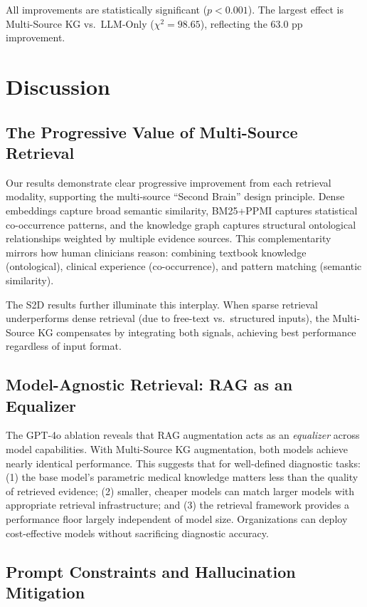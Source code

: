 \documentclass[preprint,12pt]{elsarticle}
\begin{document}
All improvements are statistically significant ($p < 0.001$). The largest effect is Multi-Source KG vs.\ LLM-Only ($\chi^2 = 98.65$), reflecting the 63.0 pp improvement.

\section{Discussion}
\label{sec:discussion}

\subsection{The Progressive Value of Multi-Source Retrieval}

Our results demonstrate clear progressive improvement from each retrieval modality, supporting the multi-source ``Second Brain'' design principle. Dense embeddings capture broad semantic similarity, BM25+PPMI captures statistical co-occurrence patterns, and the knowledge graph captures structural ontological relationships weighted by multiple evidence sources. This complementarity mirrors how human clinicians reason: combining textbook knowledge (ontological), clinical experience (co-occurrence), and pattern matching (semantic similarity).

The S2D results further illuminate this interplay. When sparse retrieval underperforms dense retrieval (due to free-text vs.\ structured inputs), the Multi-Source KG compensates by integrating both signals, achieving best performance regardless of input format.

\subsection{Model-Agnostic Retrieval: RAG as an Equalizer}

The GPT-4o ablation reveals that RAG augmentation acts as an \emph{equalizer} across model capabilities. With Multi-Source KG augmentation, both models achieve nearly identical performance. This suggests that for well-defined diagnostic tasks: (1) the base model's parametric medical knowledge matters less than the quality of retrieved evidence; (2) smaller, cheaper models can match larger models with appropriate retrieval infrastructure; and (3) the retrieval framework provides a performance floor largely independent of model size. Organizations can deploy cost-effective models without sacrificing diagnostic accuracy.

\subsection{Prompt Constraints and Hallucination Mitigation}
\end{document}

